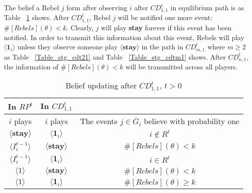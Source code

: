 \documentclass[12pt,letter]{article}
\theoremstyle{definition}
\theoremstyle{remark}
\theoremstyle{claim}
\begin{document}
The belief a Rebel $j$ form after observing $i$ after $CD^t_{1,1}$ in equilibrium path is as Table ~\ref{Table_blf_up_cdt11} shows. After $CD^t_{1,1}$, Rebel $j$ will be notified one more event: $\#[Rebels](\theta)< k$. Clearly, $j$ will play \textbf{stay} forever if this event has been notified. In order to transmit this information about this event, Rebels will play $\langle \mathbf{1}_i \rangle$ unless they observe someone play $\langle \textbf{stay} \rangle$ in the path in $CD^t_{m,1}$ where $m\geq 2$ as Table ~\ref{Table_stg_cdt21} and Table ~\ref{Table_stg_cdtm1} shows. After $CD^t_{n,1}$, the information of $\#[Rebels](\theta)< k$ will be transmitted across all players. 
\begin{table}[ht]
\caption{Belief updating after $CD^t_{1,1}$, $t>0$}
\label{Table_blf_up_cdt11}
\begin{center}
\begin{tabular}{c c c}
In $RP^t$ 	&  	In $CD^t_{1,1}$		&  \\
\hline
\hline
$i$ plays 		&  	$i$ plays		& The events $j\in \bar{G}_i$ believe with probability one  \\
\hline
$\langle  \textbf{stay} \rangle$ 	& 	$\langle \mathbf{1}_i \rangle$	    & $i\notin R^t$ \\
$\langle  {I^{t-1}_i} \rangle$ 		&  $\langle \textbf{stay} \rangle$		& $\#[Rebels](\theta)< k$     \\
$\langle  {I^{t-1}_i} \rangle$ 		&  $\langle \mathbf{1}_i \rangle$		& $i\in R^t$     \\
$\langle 1 \rangle$ 		             &  $\langle \textbf{stay} \rangle$		& $\#[Rebels](\theta)< k$  \\
$\langle 1 \rangle$ 		             &  $\langle \mathbf{1}_i \rangle$		&  $\#[Rebels](\theta)\geq k$ 
\end{tabular}
\end{center}
\end{table}
\end{document}
